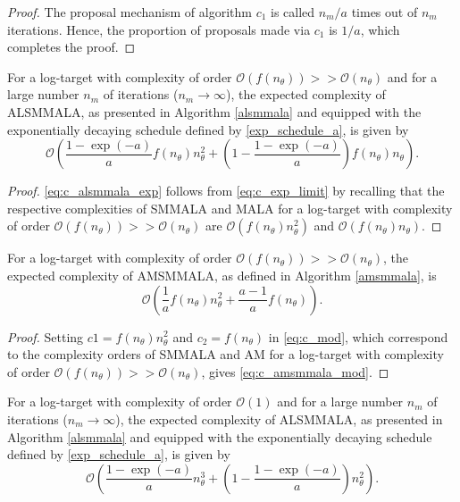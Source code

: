 \documentclass[twoside,11pt]{article}
\begin{document}
\begin{proof}
The proposal mechanism of algorithm $c_1$ is called $n_m/a$ times out of $n_m$ iterations. Hence, the proportion of proposals
made via $c_1$ is $1/a$, which completes the proof.
\end{proof}

\begin{lemma}
For a log-target with complexity of order $\mathcal{O}(f(n_{\theta}))>>\mathcal{O}(n_{\theta})$ and for a large number $n_m$ 
of iterations ($n_m\rightarrow\infty$), the expected complexity of ALSMMALA, as presented in Algorithm \ref{alsmmala} and 
equipped with the exponentially decaying schedule defined by \eqref{exp_schedule_a}, is given by
\begin{equation}
\label{eq:c_alsmmala_exp}
\mathcal{O}\left(
\dfrac{1-\exp{(-a)}}{a}f(n_{\theta})n_{\theta}^2+
\left(1-\dfrac{1-\exp{(-a)}}{a}\right)f(n_{\theta})n_{\theta}
\right).
\end{equation}
\end{lemma}

\begin{proof}
\eqref{eq:c_alsmmala_exp} follows from \eqref{eq:c_exp_limit} by recalling that the respective complexities of SMMALA and 
MALA for a log-target with complexity of order $\mathcal{O}(f(n_{\theta}))>>\mathcal{O}(n_{\theta})$ are 
$\mathcal{O}(f(n_{\theta})n_{\theta}^2)$ and $\mathcal{O}(f(n_{\theta})n_{\theta})$.
\end{proof}

\begin{lemma}
For a log-target with complexity of order $\mathcal{O}(f(n_{\theta}))>>\mathcal{O}(n_{\theta})$, the expected complexity of 
AMSMMALA, as defined in 
Algorithm \ref{amsmmala}, is
\begin{equation}
\label{eq:c_amsmmala_mod}
\mathcal{O}\left(
\dfrac{1}{a}f(n_{\theta})n_{\theta}^2+
\dfrac{a-1}{a}f(n_{\theta})
\right).
\end{equation}
\end{lemma}

\begin{proof}
Setting $c1=f(n_{\theta})n_{\theta}^2$ and $c_2=f(n_{\theta})$ in \eqref{eq:c_mod}, which correspond to the complexity 
orders of SMMALA and AM for a log-target with complexity of order $\mathcal{O}(f(n_{\theta}))>>\mathcal{O}(n_{\theta})$, 
gives \eqref{eq:c_amsmmala_mod}.
\end{proof}

\begin{lemma}
	For a log-target with complexity of order $\mathcal{O}(1)$ and for a large number $n_m$ of iterations 
	($n_m\rightarrow\infty$), the expected complexity of ALSMMALA, as presented in Algorithm \ref{alsmmala} and equipped with 
	the exponentially decaying schedule defined by \eqref{exp_schedule_a}, is given by
	\begin{equation}
	\label{eq:c_alsmmala_exp_simple}
	\mathcal{O}\left(
	\dfrac{1-\exp{(-a)}}{a}n_{\theta}^3+
	\left(1-\dfrac{1-\exp{(-a)}}{a}\right)n_{\theta}^2
	\right).
	\end{equation}
\end{lemma}
\end{document}
